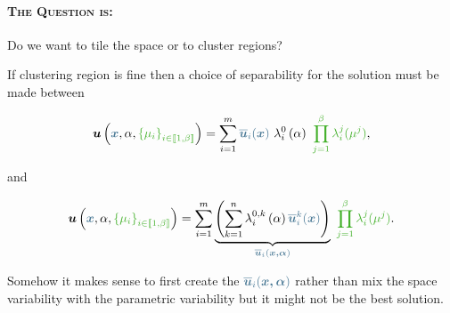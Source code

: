\paragraph{\textsc{The Question is:}} Do we want to tile the space or to cluster regions?


If clustering region is fine then a choice of separability for the solution must be made between

    \begin{equation}
        \vect{u}\left(\textcolor{BleuLMS!70}{\vect{x}}, \alpha, \textcolor{LGreenLMS}{\left\{\mu_i\right\}_{i \in \llbracket 1, \beta \rrbracket}}\right) = \sum\limits_{i=1}^m \textcolor{BleuLMS!70}{\overline{\vect{u}}_i(\vect{x})}~\lambda_i^0\left( \alpha \right) ~\textcolor{LGreenLMS}{\prod_{j=1}^{\beta}\lambda_i^j(\mu^j)},
    \end{equation}

    and

    
    \begin{equation}
        \vect{u}\left(\textcolor{BleuLMS!70}{\vect{x}}, \alpha, \textcolor{LGreenLMS}{\left\{\mu_i\right\}_{i \in \llbracket 1, \beta \rrbracket}}\right) = \sum\limits_{i=1}^m \underbrace{\left (\sum\limits_{k=1}^n \lambda_i^{0,k}\left( \alpha \right) \textcolor{BleuLMS!70}{\overline{\vect{u}}_i^k(\vect{x})} \right)}_{\textcolor{BleuLMS!70}{\overline{\vect{u}}_i(\vect{x,\alpha})}} ~\textcolor{LGreenLMS}{\prod_{j=1}^{\beta}\lambda_i^j(\mu^j)}.
    \end{equation}


    Somehow it makes sense to first create the $\textcolor{BleuLMS!70}{\overline{\vect{u}}_i(\vect{x,\alpha})}$ rather than mix the space variability with the parametric variability but it might not be the best solution.



